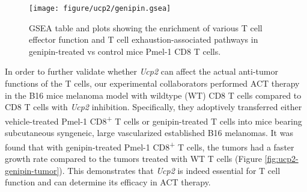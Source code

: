 \documentclass[12pt,twoside,openany,\mydriver]{thesis}  %
\begin{document}
\begin{table}

\caption{\label{tab:ucp2-genipin-de}DE results of selected T cell differentiation and function marker genes in genipin-treated vs control mice Pmel-1 CD8 T cells.}
\centering
{}
\end{table}
\begin{figure}
\texttt{[image: figure/ucp2/genipin.gsea]} \caption{GSEA table and plots showing the enrichment of various T cell effector function and T cell exhaustion-associated pathways in genipin-treated vs control mice Pmel-1 CD8 T cells.}\label{fig:ucp2-genipin-gsea}
\end{figure}
In order to further validate whether \emph{Ucp2} can affect the actual anti-tumor functions of the T cells, our experimental collaborators performed ACT therapy in the B16 mice melanoma model with wildtype (WT) CD8 T cells compared to CD8 T cells with \emph{Ucp2} inhibition. Specifically, they adoptively transferred either vehicle-treated Pmel-1 CD8\textsuperscript{+} T cells or genipin-treated T cells into mice bearing subcutaneous syngeneic, large vascularized established B16 melanomas. It was found that with genipin-treated Pmel-1 CD8\textsuperscript{+} T cells, the tumors had a faster growth rate compared to the tumors treated with WT T cells (Figure \ref{fig:ucp2-genipin-tumor}). This demonstrates that \emph{Ucp2} is indeed essential for T cell function and can determine its efficacy in ACT therapy.
\end{document}
